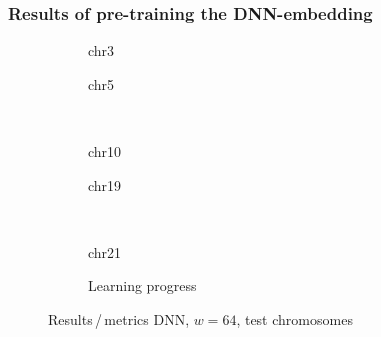 \subsubsection{Results of pre-training the DNN-embedding} \label{sec:appendix:pretraining_results}
\begin{figure}[h!] %
    \begin{subfigure}{0.45\textwidth}
        \scriptsize
        \caption{chr3}
    \end{subfigure} \hfill
    \begin{subfigure}{0.45\textwidth}
        \scriptsize
        \caption{chr5}
    \end{subfigure}\\[5mm]
    \begin{subfigure}{0.45\textwidth}
        \scriptsize
        \caption{chr10}
    \end{subfigure}\hfill
    \begin{subfigure}{0.45\textwidth}
        \scriptsize
        \caption{chr19}
    \end{subfigure}\\[3mm]
    \centering
    \begin{subfigure}{0.45\textwidth}
        \scriptsize
        \caption{chr21}
    \end{subfigure} \hfill
    \begin{subfigure}{0.45\textwidth}
        \scriptsize
        \caption{Learning progress} \label{fig:results:DNN64_lossEpochs}
    \end{subfigure}
    \caption{Results\,/\,metrics DNN, $w=64$, test chromosomes}   \label{fig:results:DNN64_pearson}
\end{figure}
